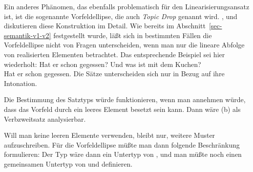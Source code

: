 Ein anderes Phänomen, das ebenfalls problematisch für den Linearisierungsansatz ist,
ist die sogenannte Vorfeldellipse, die auch \emph{Topic Drop} genannt
wird. \citet{Huang84},
\citet{Fries88b} und \citet{Hoffmann97a} diskutieren diese Konstruktion im Detail.
Wie bereits im Abschnitt~\ref{sec-semantik-v1-v2} festgestellt wurde, läßt sich in bestimmten
Fällen die Vorfeldellipse nicht von Fragen unterscheiden, wenn man nur die lineare Abfolge
von realisierten Elementen betrachtet. Das entsprechende Beispiel sei hier wiederholt:
\eal
\label{bsp-hat-er-gegessen-zwei}
\ex Hat er schon gegessen?
\ex Und was ist mit dem Kuchen?\\
    Hat er schon gegessen.
\zl
Die Sätze unterscheiden sich nur in Bezug auf ihre Intonation.

Die Bestimmung des Satztyps würde funktionieren, wenn man annehmen würde, dass das Vorfeld
durch ein leeres Element besetzt sein kann. Dann wäre (b) als Verbzweitsatz analysierbar.

Will man keine leeren Elemente verwenden, bleibt nur, weitere Muster aufzuschreiben. Für die Vorfeldellipse
müßte man dann \zb folgende Beschränkung formulieren:
\ea
{} \impl {}
\z
Der Typ  wäre dann ein Untertyp von , und man müßte
noch einen gemeinsamen Untertyp von  und  definieren.

